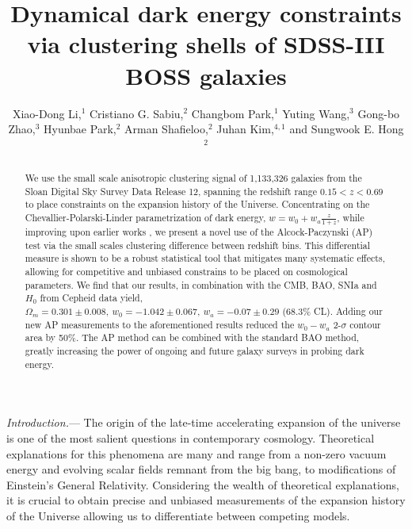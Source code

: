 \documentclass[prl,twocolumn,superscriptaddress,aps,amsmath,amssymb,nofootinbib,altaffilletter]{revtex4}
\begin{document}
\title{Dynamical dark energy constraints via clustering shells of SDSS-III BOSS galaxies}

\author{ 
Xiao-Dong Li,$^{1}$
Cristiano G. Sabiu,$^{2}$
Changbom Park,$^{1}$
Yuting Wang,$^{3}$
Gong-bo Zhao,$^{3}$
Hyunbae Park,$^{2}$
Arman Shafieloo,$^{2}$
Juhan Kim,$^{4,1}$
and Sungwook E. Hong$^{2}$}


\begin{abstract}
We use the small scale anisotropic clustering signal of 1,133,326 galaxies from the Sloan Digital Sky Survey Data Release 
12, spanning the redshift range $0.15<z<0.69$ to place constraints on the expansion history of the Universe. 
Concentrating on the Chevallier-Polarski-Linder parametrization of dark energy, $w=w_0+w_a\frac{z}{1+z}$,
while improving upon earlier works \citep{Li2016}, 
we present a novel use of the Alcock-Paczynski (AP) test via the small scales clustering difference between redshift bins. 
This differential measure is shown to be a robust statistical tool that mitigates many systematic effects, 
allowing for competitive and unbiased constrains to be placed on cosmological parameters.
We find that our results, in combination with the CMB, BAO, SNIa and $H_0$ from Cepheid data yield, 
$\Omega_m = 0.301 \pm 0.008,\ w_0 = -1.042 \pm 0.067,\ w_a = -0.07 \pm 0.29$ (68.3\% CL). 
Adding our new AP measurements to the aforementioned results reduced the $w_0-w_a$ 2-$\sigma$ contour area by 50\%.
The AP method can be combined with the standard BAO method, 
greatly increasing the power of ongoing and future galaxy surveys in probing dark energy.
\end{abstract}

\maketitle


{\it Introduction.}---
The  origin  of  the late-time accelerating  expansion  of  the  universe  is  one of  the  most  salient  questions  in  contemporary cosmology. Theoretical explanations for this phenomena are many and range from a non-zero  vacuum energy and evolving  scalar  fields  remnant  from  the  big  bang, to modifications of Einstein's General Relativity\cite{2012IJMPD..2130002Y}. 
Considering the wealth of theoretical explanations, it is crucial to obtain precise and unbiased measurements of the expansion history of the Universe allowing us to 
differentiate between competing models. 
\end{document}
